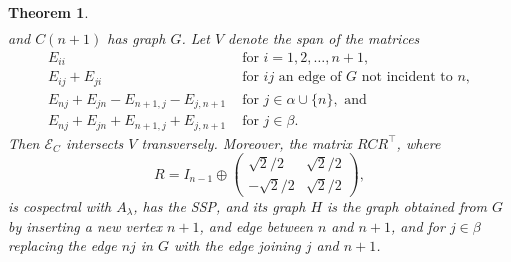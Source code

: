 \documentclass[11pt]{article}
\def\red{\color{red}}
\newtheorem{thm}{Theorem}[section]
\theoremstyle{definition}
\theoremstyle{definition}
\theoremstyle{definition}
\newcommand{\mei}{\mathcal{E}} %
\def\trans{^{\top}}
\begin{document}
\begin{thm}
\[{\begin{array}{ll}
    \end{array} }  \]
 and $C(n+1)$ has graph $G$.  Let  $V$ denote the span of 
the matrices  %
\[ 
\begin{array}{cl}
E_{ii}& \mbox{ for }i=1,2,\ldots, n+1,\\ 
 E_{ij}+ E_{ji} &  \mbox{ for $ij$ an edge of $G$ not incident to $n$},\\
  E_{nj}+ E_{jn} - E_{n+1,j}-E_{j,n+1} & \mbox{ for }j\in \alpha\cup \{n\},\mbox{ and}\\
  E_{nj}+E_{jn}+ E_{n+1,j}+ E_{j,n+1}  &\mbox{ for }j\in \beta.
\end{array} 
\]
Then  $\mei_C$ intersects $V$ transversely.
 Moreover, the matrix $RCR\trans$, where 
 \[
 R=I_{n-1} \oplus \left( \begin{array}{rr} \sqrt{2}/2 & \sqrt{2}/{2} \\
 -\sqrt{2}/{2} & \sqrt{2}/{2} \end{array} \right), 
 \]
 is cospectral with $A_{\lambda}$, has the SSP, and its graph  $H$ is the graph obtained from $G$ by inserting a new vertex $n+1$, and edge between $n$ and $n+1$, and 
for  $j\in {\beta}$ replacing the edge $nj$ in $G$ with   the edge joining $j$ and $n+1$. \end{thm}
\end{document}

